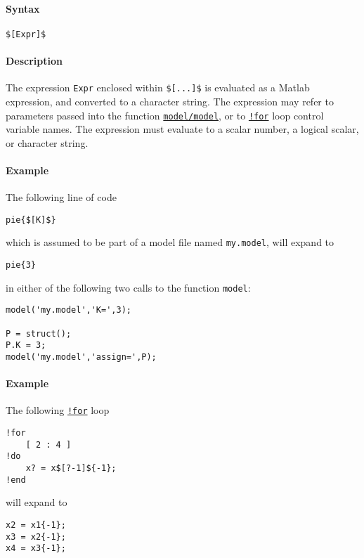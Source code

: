 


	\paragraph{Syntax}

\begin{verbatim}
$[Expr]$
\end{verbatim}

\paragraph{Description}

The expression \texttt{Expr} enclosed within \texttt{\${[}...{]}\$} is
evaluated as a Matlab expression, and converted to a character string.
The expression may refer to parameters passed into the function
\href{model}{\texttt{model/model}}, or to
\href{modellang/for}{\texttt{!for}} loop control variable names. The
expression must evaluate to a scalar number, a logical scalar, or
character string.

\paragraph{Example}

The following line of code

\begin{verbatim}
pie{$[K]$}
\end{verbatim}

which is assumed to be part of a model file named \texttt{my.model},
will expand to

\begin{verbatim}
pie{3}
\end{verbatim}

in either of the following two calls to the function \texttt{model}:

\begin{verbatim}
model('my.model','K=',3);

P = struct();
P.K = 3;
model('my.model','assign=',P);
\end{verbatim}

\paragraph{Example}

The following \href{modellang/for}{\texttt{!for}} loop

\begin{verbatim}
!for
    [ 2 : 4 ]
!do
    x? = x$[?-1]${-1};
!end
\end{verbatim}

will expand to

\begin{verbatim}
x2 = x1{-1};
x3 = x2{-1};
x4 = x3{-1};
\end{verbatim}



